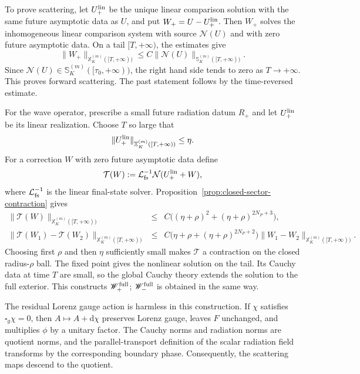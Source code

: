 \documentclass[11pt]{article}
\numberwithin{equation}{section}
\theoremstyle{plain}
\theoremstyle{definition}
\theoremstyle{remark}
\newcommand{\dd}{\mathrm{d}}
\begin{document}
To prove scattering, let \(U^{\rm lin}_+\) be the unique linear comparison solution with the same future asymptotic data as \(U\), and put \(W_+=U-U^{\rm lin}_+\).  Then \(W_+\) solves the inhomogeneous linear comparison system with source \(\mathcal N(U)\) and with zero future asymptotic data.  On a tail \([T,+\infty)\), the estimates give
\begin{equation}\label{eq:detailed-tail-scattering}
 \|W_+\|_{\mathbb X_K^{(m)}([T,+\infty))}
 \le C\|\mathcal N(U)\|_{\mathbb S_K^{(m)}([T,+\infty))}.
\end{equation}
Since \(\mathcal N(U)\in\mathbb S_K^{(m)}([\tau_0,+\infty))\), the right hand side tends to zero as \(T\to+\infty\).  This proves forward scattering.  The past statement follows by the time-reversed estimate.

For the wave operator, prescribe a small future radiation datum \(R_+\) and let \(U^{\rm lin}_+\) be its linear realization.  Choose \(T\) so large that
\begin{equation}\label{eq:detailed-tail-small}
 \|U^{\rm lin}_+\|_{\mathbb X_K^{(m)}([T,+\infty))}\le \eta.
\end{equation}
For a correction \(W\) with zero future asymptotic data define
\begin{equation}\label{eq:detailed-fixedpoint}
 \mathcal T(W):=\mathcal L_{\rm fs}^{-1}\mathcal N(U^{\rm lin}_++W),
\end{equation}
where \(\mathcal L_{\rm fs}^{-1}\) is the linear final-state solver.  Proposition~\ref{prop:closed-sector-contraction} gives
\begin{eqnarray}
 \|\mathcal T(W)\|_{\mathbb X_K^{(m)}([T,+\infty))}
 &\le& C\bigl((\eta+\rho)^2+(\eta+\rho)^{2N_P+3}\bigr),
 \label{eq:detailed-T-map}\\
 \|\mathcal T(W_1)-\mathcal T(W_2)\|_{\mathbb X_K^{(m)}([T,+\infty))}
 &\le& C\bigl(\eta+\rho+(\eta+\rho)^{2N_P+2}\bigr)
 \|W_1-W_2\|_{\mathbb X_K^{(m)}([T,+\infty))}.
 \label{eq:detailed-T-lip}
\end{eqnarray}
Choosing first \(\rho\) and then \(\eta\) sufficiently small makes \(\mathcal T\) a contraction on the closed radius-\(\rho\) ball.  The fixed point gives the nonlinear solution on the tail.  Its Cauchy data at time \(T\) are small, so the global Cauchy theory extends the solution to the full exterior.  This constructs \(\mathscr W_+^{\rm full}\); \(\mathscr W_-^{\rm full}\) is obtained in the same way.

The residual Lorenz gauge action is harmless in this construction.  If \(\chi\) satisfies \(\square_g\chi=0\), then \(A\mapsto A+\dd\chi\) preserves Lorenz gauge, leaves \(F\) unchanged, and multiplies \(\phi\) by a unitary factor.  The Cauchy norms and radiation norms are quotient norms, and the parallel-transport definition of the scalar radiation field transforms by the corresponding boundary phase.  Consequently, the scattering maps descend to the quotient.
\end{document}
